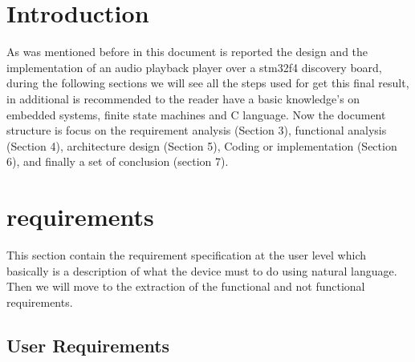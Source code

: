 \section{Introduction}


 
As was mentioned before in this document is reported the design and the implementation of an audio playback player over a stm32f4 discovery board, during the following sections we will see all the steps used for get this final result, in additional is recommended to the reader have a basic knowledge's on embedded systems, finite state machines and C language. 
\newline
\newline
Now the document structure is focus on the requirement analysis (Section 3), functional analysis (Section 4), architecture design (Section 5), Coding or implementation (Section 6), and finally a set of conclusion (section 7). 


   

\section{requirements}
This section contain the requirement specification at the user level which basically is a description of what the device must to do using natural language. Then we will move to the extraction of the functional and not functional requirements. 
\label{sec:Starting requirement}

\subsection{User Requirements}

